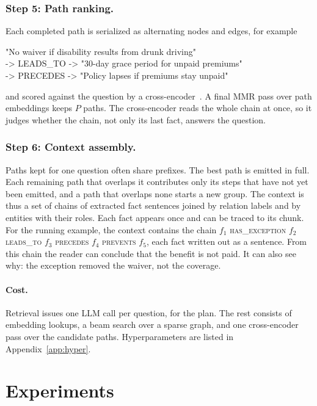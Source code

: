 \documentclass[sigconf, review, anonymous]{acmart}
\newcommand{\rel}[1]{\textsc{#1}}            %
\begin{document}
\subsubsection*{Step 5: Path ranking.}
Each completed path is serialized as alternating nodes and edges, for example
\begin{center}
\small\ttfamily
"No waiver if disability results from drunk driving"\\
-> LEADS\_TO -> "30-day grace period for unpaid premiums"\\
-> PRECEDES -> "Policy lapses if premiums stay unpaid"
\end{center}
and scored against the question by a cross-encoder~\cite{nogueira2019passage}. A final MMR pass over path embeddings keeps $P$ paths. The cross-encoder reads the whole chain at once, so it judges whether the chain, not only its last fact, answers the question.

\subsubsection*{Step 6: Context assembly.}
Paths kept for one question often share prefixes. The best path is emitted in full. Each remaining path that overlaps it contributes only its steps that have not yet been emitted, and a path that overlaps none starts a new group. The context is thus a set of chains of extracted fact sentences joined by relation labels and by entities with their roles. Each fact appears once and can be traced to its chunk. For the running example, the context contains the chain $f_1$ \rel{has\_exception} $f_2$ \rel{leads\_to} $f_3$ \rel{precedes} $f_4$ \rel{prevents} $f_5$, each fact written out as a sentence. From this chain the reader can conclude that the benefit is not paid. It can also see why: the exception removed the waiver, not the coverage.

\paragraph{\textbf{Cost.}}
Retrieval issues one LLM call per question, for the plan. The rest consists of embedding lookups, a beam search over a sparse graph, and one cross-encoder pass over the candidate paths. Hyperparameters are listed in Appendix~\ref{app:hyper}.


\section{Experiments}
\label{sec:experiments}
\end{document}
